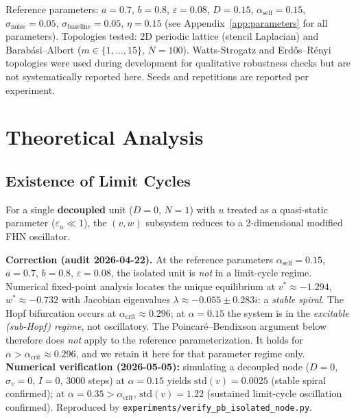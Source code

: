 \documentclass[11pt]{article}
\begin{document}
Reference parameters: $a = 0.7$, $b = 0.8$, $\varepsilon = 0.08$, $D = 0.15$, $\alpha_{\text{self}} = 0.15$, $\sigma_{\text{noise}} = 0.05$, $\sigma_{\text{baseline}} = 0.05$, $\eta = 0.15$ (see Appendix~\ref{app:parameters} for all parameters). Topologies tested: 2D periodic lattice (stencil Laplacian) and Barab\'asi--Albert ($m \in \{1, \ldots, 15\}$, $N = 100$). Watts-Strogatz and Erd\H{o}s--R\'enyi topologies were used during development for qualitative robustness checks but are not systematically reported here. Seeds and repetitions are reported per experiment.

\section{Theoretical Analysis}

\subsection{Existence of Limit Cycles}

For a single \textbf{decoupled} unit ($D = 0$, $N = 1$) with $u$ treated as a quasi-static parameter ($\varepsilon_u \ll 1$), the $(v, w)$ subsystem reduces to a 2-dimensional modified FHN oscillator.

\textbf{Correction (audit 2026-04-22).} At the reference parameters $\alpha_{\text{self}} = 0.15$, $a = 0.7$, $b = 0.8$, $\varepsilon = 0.08$, the isolated unit is \emph{not} in a limit-cycle regime. Numerical fixed-point analysis locates the unique equilibrium at $v^* \approx -1.294$, $w^* \approx -0.732$ with Jacobian eigenvalues $\lambda \approx -0.055 \pm 0.283i$: a \textit{stable spiral}. The Hopf bifurcation occurs at $\alpha_{\text{crit}} \approx 0.296$; at $\alpha = 0.15$ the system is in the \textit{excitable (sub-Hopf) regime}, not oscillatory. The Poincar\'e--Bendixson argument below therefore does \emph{not} apply to the reference parameterization. It holds for $\alpha > \alpha_{\text{crit}} \approx 0.296$, and we retain it here for that parameter regime only. \textbf{Numerical verification (2026-05-05):} simulating a decoupled node ($D = 0$, $\sigma_v = 0$, $I = 0$, 3000 steps) at $\alpha = 0.15$ yields $\mathrm{std}(v) = 0.0025$ (stable spiral confirmed); at $\alpha = 0.35 > \alpha_{\text{crit}}$, $\mathrm{std}(v) = 1.22$ (sustained limit-cycle oscillation confirmed). Reproduced by \texttt{experiments/verify\_pb\_isolated\_node.py}.
\end{document}
